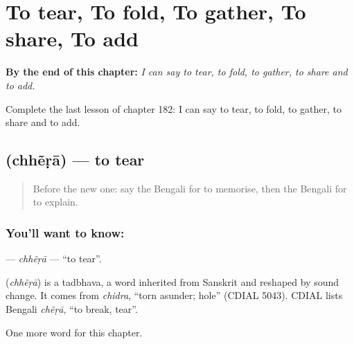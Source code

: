 
\chapter{To tear, To fold, To gather, To share, To add}
\label{ch:bn-to-tear-to-fold-to-gather-to-share-to-add}

\begin{chapteropening}
\textbf{By the end of this chapter:} \emph{I can say to tear, to fold, to gather, to share and to add.}

Complete the last lesson of chapter 182: I can say to tear, to fold, to gather, to share and to add.
\end{chapteropening}

\section[\texorpdfstring{\bn{ছেঁড়া} (chhẽṛā)}{ছেঁড়া (chhẽṛā)}]{ (chhẽṛā) — to tear}

\label{lesson:BN-C182-chhera}



\begin{quote}
Before the new one: say the Bengali for to memorise, then the Bengali for to explain.
\end{quote}

\subsection*{You'll want to know: }
\textbf{} — \emph{chhẽṛā} — \textquotedblleft{}to tear\textquotedblright{}.

\begin{cousinweb}
\textbf{} (\emph{chhẽṛā}) is a tadbhava, a word inherited from Sanskrit and reshaped by sound change. It comes from \emph{chidra}, \textquotedblleft{}torn asunder; hole\textquotedblright{} (CDIAL 5043). CDIAL lists Bengali \emph{chẽṛā}, \textquotedblleft{}to break, tear\textquotedblright{}.
\end{cousinweb}

\begin{grammarlens}[title={What you've built}]
One more word for this chapter.
\end{grammarlens}

